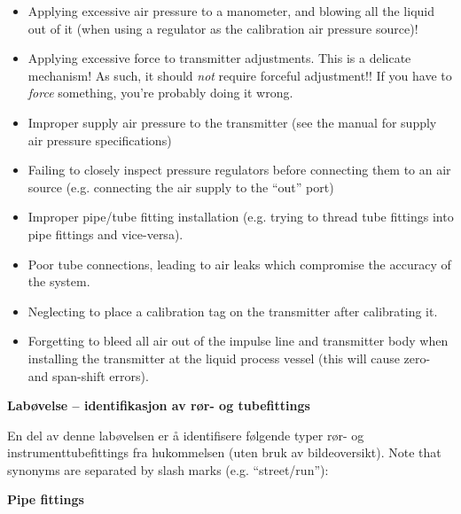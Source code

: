 {{\begin{itemize}
\item{} Applying excessive air pressure to a manometer, and blowing all the liquid out of it (when using a regulator as the calibration air pressure source)!
\item{} Applying excessive force to transmitter adjustments.  This is a delicate mechanism!  As such, it should {\it not} require forceful adjustment!!  If you have to {\it force} something, you're probably doing it wrong.
\item{} Improper supply air pressure to the transmitter (see the manual for supply air pressure specifications)
\item{} Failing to closely inspect pressure regulators before connecting them to an air source (e.g. connecting the air supply to the ``out'' port)
\item{} Improper pipe/tube fitting installation (e.g. trying to thread tube fittings into pipe fittings and vice-versa).
\item{} Poor tube connections, leading to air leaks which compromise the accuracy of the system.
\item{} Neglecting to place a calibration tag on the transmitter after calibrating it.
\item{} Forgetting to bleed all air out of the impulse line and transmitter body when installing the transmitter at the liquid process vessel (this will cause zero- and span-shift errors).
\end{itemize}






\vfil \eject

\noindent
{\bf Labøvelse -- identifikasjon av rør- og tubefittings}

\vskip 5pt

En del av denne labøvelsen er å identifisere følgende typer rør- og instrumenttubefittings fra hukommelsen (uten bruk av bildeoversikt).  Note that synonyms are separated by slash marks (e.g. ``street/run''):

\vskip 10pt

\noindent
{\bf Pipe fittings}

}}
